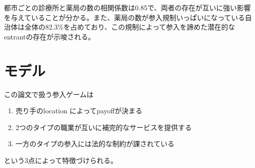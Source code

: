 \documentclass[11pt]{jsarticle}
\begin{document}
都市ごとの診療所と薬局の数の相関係数は0.85で、両者の存在が互いに強い影響を与えていることが分かる。また、薬局の数が参入規制いっぱいになっている自治体は全体の82.3\%を占めており、この規制によって参入を諦めた潜在的なentrantの存在が示唆される。

\section{モデル}

この論文で扱う参入ゲームは

\begin{enumerate}
  \item 売り手のlocation によってpayoffが決まる

  \item 2つのタイプの職業が互いに補完的なサービスを提供する

  \item 一方のタイプの参入には法的な制約が課されている
\end{enumerate}

という3点によって特徴づけられる。
\end{document}
